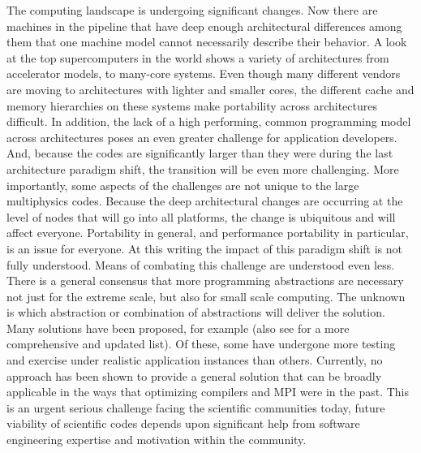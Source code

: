 The computing landscape is undergoing significant changes. Now there are machines
in the pipeline that have deep enough architectural differences among
them that one machine model cannot necessarily describe their behavior.  A look at the top supercomputers in the world shows a variety of architectures from accelerator models, to many-core systems.  Even though many different vendors are moving to architectures with lighter and smaller cores, the different cache and memory hierarchies on these systems make portability across architectures difficult.  In addition, the lack of a high performing, common programming model across architectures poses an even greater challenge for application developers.  And, because
the codes are significantly larger than they were during the last
architecture paradigm shift, the transition will be even more challenging.  More importantly, some aspects of the
challenges are not unique to the large multiphysics codes. Because the
deep architectural changes are occurring at the level of nodes that
will go into all platforms, the change is ubiquitous and will
affect everyone. Portability in general, and performance
portability in particular, is an issue for everyone. At this writing
the impact of this paradigm shift is not fully understood. Means of
combating this challenge are understood even less. There is a general
consensus that more programming abstractions are necessary not just
for the extreme scale, but also for small scale computing. The unknown
is which abstraction or combination of abstractions will deliver the
solution. Many solutions have been proposed, for example \cite{PADAL14} (also
see \cite{IDEAS} for a more comprehensive and updated
list). Of these, some have undergone more testing and exercise under
realistic application instances than others. Currently, no approach has been shown to provide a general solution that can be broadly
applicable in the ways that optimizing compilers and MPI were
in the past. This is an urgent serious challenge facing the scientific
communities today, future viability of scientific codes depends upon
significant help from software engineering expertise and motivation
within the community. 

